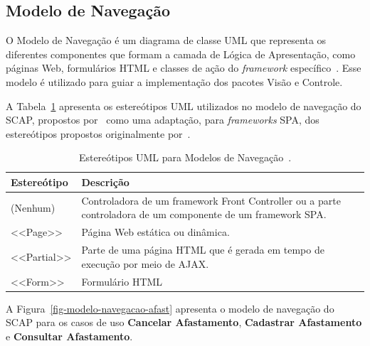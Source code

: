 \subsection{Modelo de Navegação}
\label{subsec-frameweb-navegacao}

O Modelo de Navegação é um diagrama de classe UML que representa os diferentes componentes que
formam a camada de Lógica de Apresentação, como páginas Web, formulários HTML e classes de ação do \textit{framework} específico~\cite{souza:2007}. 
Esse modelo é utilizado para guiar a implementação dos pacotes Visão e Controle.

A Tabela~\ref{tab-estereotipos-navegacao} apresenta os estereótipos UML utilizados no modelo de navegação do SCAP,
propostos por~ como uma adaptação, para \textit{frameworks} SPA,
dos estereótipos propostos originalmente por~.

\begin{table}[h!]
    \centering
    \caption{Estereótipos UML para Modelos de Navegação~\cite{hoppe:2023}.}
    \label{tab-estereotipos-navegacao}
    \begin{tabular}{|p{3cm}|p{12cm}|}
        \hline
        \textbf{Estereótipo} & \textbf{Descrição} \\
        \hline
        (Nenhum)    & Controladora de um framework Front Controller ou a parte controladora de um componente de um framework SPA. \\
        \hline
        <<Page>>    & Página Web estática ou dinâmica. \\
        \hline
        <<Partial>> & Parte de uma página HTML que é gerada em tempo de execução por meio de AJAX. \\
        \hline
        <<Form>>    & Formulário HTML \\
        \hline
    \end{tabular}
\end{table}

A Figura~\ref{fig-modelo-navegacao-afast} apresenta o modelo de navegação do SCAP para os casos de uso
\textbf{Cancelar Afastamento}, \textbf{Cadastrar Afastamento} e \textbf{Consultar Afastamento}.

